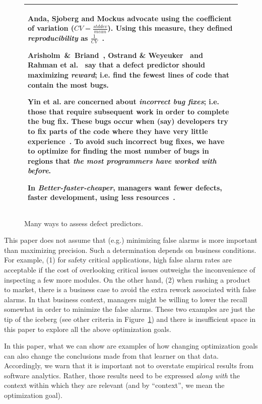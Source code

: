 \documentclass{sig-alternative}
\newcommand{\fig}[1]{Figure~\ref{fig:#1}}
\begin{document}
\begin{figure}[!t]
\small
\begin{tabular}{|p{.95\linewidth}|}\hline

 Anda, Sjoberg and Mockus advocate using the coefficient of variation ($CV=\frac{stddev}{mean}$).
Using this measure, they defined {\em reproducibility} as $\frac{1}{CV}$~\cite{anda09}.

Arisholm~\&~Briand~\cite{arisholm06},  Ostrand \& Weyeuker~\cite{ostrand04} and Rahman et al.~\cite{rahman12}
say that a defect predictor should maximizing {\em reward}; i.e. find the fewest lines of code
that contain the most bugs.

Yin et al. are concerned about
 {\em incorrect bug fixes}; i.e. those that require subsequent work in order to complete the bug fix.
These bugs occur  when (say) developers try to fix parts of the code
where they have very little experience~\cite{yin11}.  To avoid such incorrect bug fixes, we have to optimize
for finding the most number of bugs in regions that {\em the most programmers have worked with before}.

In {\em Better-faster-cheaper},   managers want
 fewer defects,  faster development,  using less resources~\cite{Green,elrawas10,me07f,me09f}.
\\\hline
\end{tabular}
\caption{Many ways to assess defect predictors.}\label{fig:criteria}
\end{figure}


This paper does not assume that (e.g.) minimizing false alarms is 
more important than maximizing   precision. Such a determination 
depends on   business conditions.
For example,
(1) for safety critical applications, high false alarm rates are  acceptable if the cost
of overlooking  critical issues outweighs the inconvenience of   inspecting a few more
modules. 
On the other hand, (2) when rushing a product to market,  there is a business case to 
avoid the extra rework associated with false alarms.  In that business context, 
managers might be willing to lower the recall somewhat in order to minimize the false alarms.
These two examples are just the tip of the iceberg (see other criteria in \fig{criteria})
and there is insufficient space in this paper to explore all the above optimization goals.

In this paper, what we can  show are examples of how  changing  optimization goals can also change 
the conclusions made from that learner on that data. Accordingly, we warn that it is important not to overstate  empirical results from software analytics.
Rather, those results need to be expressed {\em along with} the context within which they are
relevant (and by ``context'', we mean the optimization goal).
\end{document}
